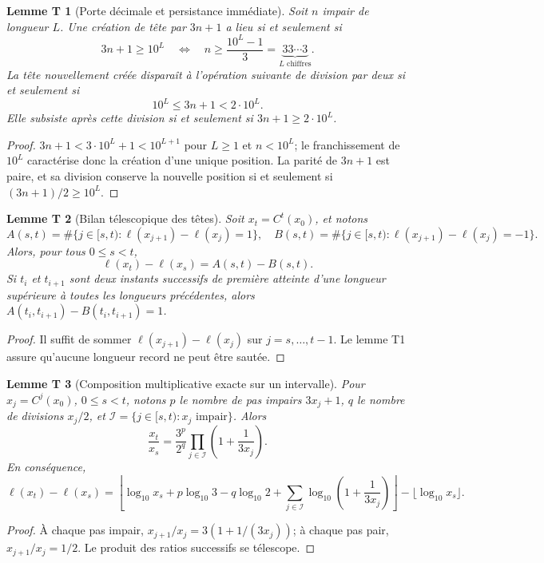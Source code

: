 \documentclass[11pt,a4paper]{article}
\newtheorem{lemme}{Lemme T}
\newcommand{\ellg}{\ell}
\begin{document}
\begin{lemme}[Porte décimale et persistance immédiate]
Soit $n$ impair de longueur $L$. Une création de tête par $3n+1$
a lieu si et seulement si
\[
3n+1\ge10^L\quad\Longleftrightarrow\quad
n\ge\frac{10^L-1}{3}=\underbrace{33\cdots3}_{L\text{ chiffres}}.
\]
La tête nouvellement créée disparaît à l'opération suivante de division
par deux si et seulement si
\[
10^L\le3n+1<2\cdot10^L.
\]
Elle subsiste après cette division si et seulement si $3n+1\ge2\cdot10^L$.
\end{lemme}
\begin{proof}
$3n+1<3\cdot10^L+1<10^{L+1}$ pour $L\ge1$ et $n<10^L$;
le franchissement de $10^L$ caractérise donc la création d'une unique position.
La parité de $3n+1$ est paire, et sa division conserve la nouvelle position
si et seulement si $(3n+1)/2\ge10^L$.
\end{proof}

\begin{lemme}[Bilan télescopique des têtes]
Soit $x_t=C^t(x_0)$, et notons
\[
A(s,t)=\#\{j\in[s,t):\ellg(x_{j+1})-\ellg(x_j)=1\},\quad
B(s,t)=\#\{j\in[s,t):\ellg(x_{j+1})-\ellg(x_j)=-1\}.
\]
Alors, pour tous $0\le s<t$,
\[
\boxed{\ellg(x_t)-\ellg(x_s)=A(s,t)-B(s,t).}
\]
Si $t_i$ et $t_{i+1}$ sont deux instants successifs de première atteinte
d'une longueur supérieure à toutes les longueurs précédentes,
alors $A(t_i,t_{i+1})-B(t_i,t_{i+1})=1$.
\end{lemme}
\begin{proof}
Il suffit de sommer $\ellg(x_{j+1})-\ellg(x_j)$ sur
$j=s,\ldots,t-1$. Le lemme T1 assure qu'aucune longueur record
ne peut être sautée.
\end{proof}

\begin{lemme}[Composition multiplicative exacte sur un intervalle]
Pour $x_j=C^j(x_0)$, $0\le s<t$, notons $p$ le nombre de pas impairs
$3x_j+1$, $q$ le nombre de divisions $x_j/2$, et
$\mathcal I=\{j\in[s,t):x_j\text{ impair}\}$.
Alors
\[
\boxed{\frac{x_t}{x_s}=\frac{3^p}{2^q}
\prod_{j\in\mathcal I}\left(1+\frac{1}{3x_j}\right).}
\]
En conséquence,
\[
\ellg(x_t)-\ellg(x_s)
=\left\lfloor\log_{10}x_s+p\log_{10}3-q\log_{10}2
+\sum_{j\in\mathcal I}\log_{10}\left(1+\frac1{3x_j}\right)\right\rfloor
-\lfloor\log_{10}x_s\rfloor.
\]
\end{lemme}
\begin{proof}
À chaque pas impair, $x_{j+1}/x_j=3(1+1/(3x_j))$;
à chaque pas pair, $x_{j+1}/x_j=1/2$.
Le produit des ratios successifs se télescope.
\end{proof}
\end{document}
